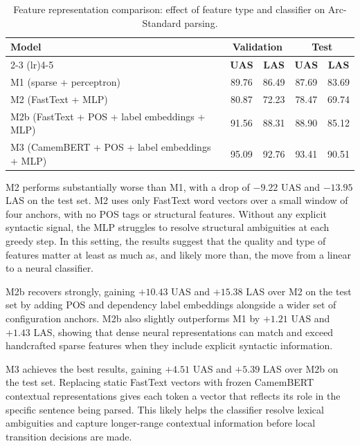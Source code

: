 \documentclass[12pt,letterpaper]{article}
\begin{document}
\begin{table}[ht]
\centering
\caption{Feature representation comparison: effect of feature type and classifier on Arc-Standard parsing.}
\label{tab:representation_comparison}
\small
\begin{tabular}{lcccc}
\toprule
\textbf{Model} & \multicolumn{2}{c}{\textbf{Validation}} & \multicolumn{2}{c}{\textbf{Test}} \\
\cmidrule(lr){2-3} \cmidrule(lr){4-5}
& \textbf{UAS} & \textbf{LAS} & \textbf{UAS} & \textbf{LAS} \\
\midrule
M1  (sparse + perceptron)                    & 89.76 & 86.49 & 87.69 & 83.69 \\
M2  (FastText + MLP)                         & 80.87 & 72.23 & 78.47 & 69.74 \\
M2b (FastText + POS + label embeddings + MLP)& 91.56 & 88.31 & 88.90 & 85.12 \\
M3  (CamemBERT + POS + label embeddings + MLP)& 95.09 & 92.76 & 93.41 & 90.51 \\
\bottomrule
\end{tabular}
\end{table}
\FloatBarrier
M2 performs substantially worse than M1, with a drop of $-9.22$ UAS and $-13.95$ LAS on the test set. M2 uses only FastText word vectors over a small window of four anchors, with no POS tags or structural features. Without any explicit syntactic signal, the MLP struggles to resolve structural ambiguities at each greedy step. In this setting, the results suggest that the quality and type of features matter at least as much as, and likely more than, the move from a linear to a neural classifier.

M2b recovers strongly, gaining $+10.43$ UAS and $+15.38$ LAS over M2 on the test set by adding POS and dependency label embeddings alongside a wider set of configuration anchors. M2b also slightly outperforms M1 by $+1.21$ UAS and $+1.43$ LAS, showing that dense neural representations can match and exceed handcrafted sparse features when they include explicit syntactic information.

M3 achieves the best results, gaining $+4.51$ UAS and $+5.39$ LAS over M2b on the test set. Replacing static FastText vectors with frozen CamemBERT contextual representations gives each token a vector that reflects its role in the specific sentence being parsed. This likely helps the classifier resolve lexical ambiguities and capture longer-range contextual information before local transition decisions are made.
\end{document}
